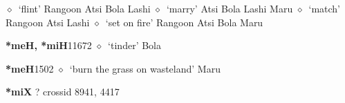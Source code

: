 \begin{list}{}{\leftmargin=1.5em \itemindent=-1.5em}
\hspace{1ex}
         $\diamond$~`flint'
         Rangoon 
\hspace{1ex}
         Atsi 
\hspace{1ex}
         Bola 
\hspace{1ex}
         Lashi 
\hspace{1ex}
         $\diamond$~`marry'
         Atsi 
\hspace{1ex}
         Bola 
\hspace{1ex}
         Lashi 
\hspace{1ex}
         Maru 
\hspace{1ex}
         $\diamond$~`match'
         Rangoon 
\hspace{1ex}
         Atsi 
\hspace{1ex}
         Lashi 
\hspace{1ex}
         $\diamond$~`set on fire'
         Rangoon 
\hspace{1ex}
         Atsi 
\hspace{1ex}
         Bola 
\hspace{1ex}
         Maru 
  \item {\footnotesize \textbf{*meH, *miH}}{\tiny 11672}
\hspace{1ex}
         $\diamond$~`tinder'
         Bola 
  \item {\footnotesize \textbf{*meH}}{\tiny 1502}
\hspace{1ex}
         $\diamond$~`burn the grass on wasteland'
         Maru 
  \end{list}
\item
\textbf{*miX}
?
  {\tiny crossid 8941, 4417}

